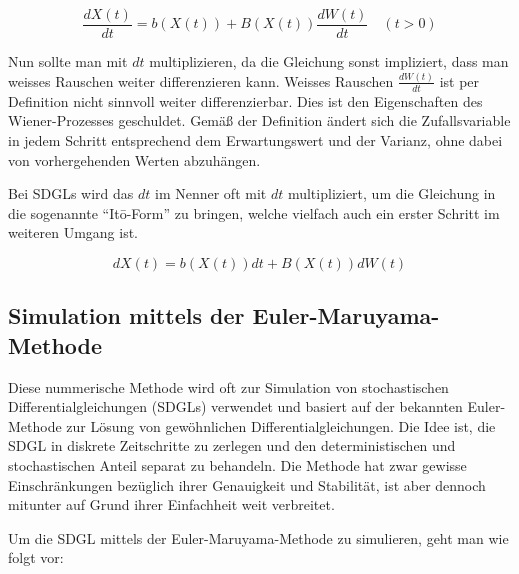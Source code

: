 \begin{equation}
	\frac{dX(t)}{dt} = b(X(t)) + B(X(t)) \frac{dW(t)}{dt} \quad (t>0)
\end{equation}

Nun sollte man mit $ dt $  multiplizieren, da die Gleichung sonst impliziert, dass man weisses Rauschen weiter differenzieren kann. Weisses Rauschen $ \frac{dW(t)}{dt} $ ist per Definition nicht sinnvoll weiter differenzierbar. Dies ist den Eigenschaften des Wiener-Prozesses geschuldet. Gemäß der Definition ändert sich die Zufallsvariable in jedem Schritt entsprechend dem Erwartungswert und der Varianz, ohne dabei von vorhergehenden Werten abzuhängen.

Bei SDGLs wird das $ dt $ im Nenner oft mit $ dt $ multipliziert, um die Gleichung in die sogenannte ``Itō-Form'' zu bringen, welche vielfach auch ein erster Schritt im weiteren Umgang ist.

\begin{equation}
	dX(t) = b(X(t)) dt + B(X(t)) dW(t)
\end{equation}


\subsection{Simulation mittels der Euler-Maruyama-Methode\label{brown:Simulation}}

Diese nummerische Methode wird oft zur Simulation von stochastischen Differentialgleichungen (SDGLs) verwendet und basiert auf der bekannten Euler-Methode zur Lösung von gewöhnlichen Differentialgleichungen. Die Idee ist, die SDGL in diskrete Zeitschritte zu zerlegen und den deterministischen und stochastischen Anteil separat zu behandeln. Die Methode hat zwar gewisse Einschränkungen bezüglich ihrer Genauigkeit und Stabilität, ist aber dennoch mitunter auf Grund ihrer Einfachheit weit verbreitet.




Um die SDGL mittels der Euler-Maruyama-Methode zu simulieren, geht man wie folgt vor:

